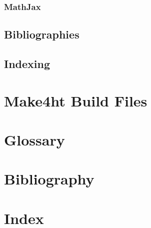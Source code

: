 \documentclass{book}
\begin{document}
\subsection{MathJax}

\section{Bibliographies}
\section{Indexing}

\chapter{Make4ht Build Files}

\chapter{Glossary}
\chapter{Bibliography}
\chapter{Index}
\end{document}
